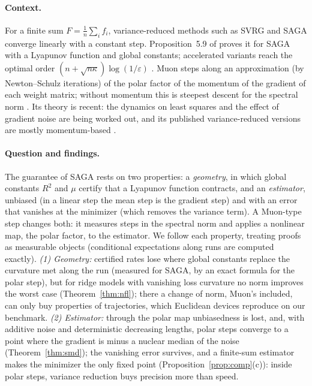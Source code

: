 \documentclass[10pt]{article}
\theoremstyle{remark}
\begin{document}
\paragraph{Context.} For a finite sum $F=\frac1n\sum_if_i$, variance-reduced methods such as SVRG
\cite{johnson2013accelerating} and SAGA \cite{defazio2014saga} converge linearly with a constant step. Proposition~5.9 of \cite{bach2024learning} proves it for SAGA with
a Lyapunov function and global constants; accelerated variants reach the optimal order
$(n+\sqrt{n\kappa})\log(1/\varepsilon)$ \cite{allenzhu2018katyusha,kovalev2020dont,lan2018optimal}. Muon
\cite{jordan2024muon} steps along an approximation (by Newton--Schulz iterations) of the polar factor of the momentum of
the gradient of each weight matrix; without momentum this is steepest descent for the spectral norm
\cite{carlson2015stochastic,bernstein2024old}. Its theory is recent: the dynamics on least squares
\cite{shulgin2026quadratic,vasudeva2025muon} and the effect of gradient noise \cite{xie2026muon,chen2026when,paquette2026phases}
are being worked out, and its published variance-reduced versions are mostly momentum-based \cite{liu2025marsm}.

\paragraph{Question and findings.} The guarantee of SAGA rests on two properties: a \emph{geometry}, in which global
constants $R^2$ and $\mu$ certify that a Lyapunov function contracts, and an \emph{estimator}, unbiased (in a linear
step the mean step is the gradient step) and with an error that vanishes at the minimizer (which removes the variance
term). A Muon-type step changes both: it measures steps in the spectral norm and applies a nonlinear map, the polar
factor, to the estimator. We follow each property, treating proofs as measurable objects
(conditional expectations along runs are computed exactly). \emph{(1) Geometry:} certified rates lose
where global constants replace the curvature met along the run (measured for SAGA, by an exact formula for the polar
step), but for ridge
models with vanishing loss curvature no norm improves the worst case (Theorem~\ref{thm:nfl}); there a change of
norm, Muon's included, can only buy properties of trajectories, which Euclidean devices reproduce on our benchmark. \emph{(2) Estimator:}
through the polar map unbiasedness is lost, and, with additive noise and deterministic decreasing lengths, polar steps
converge to a point where the gradient is minus a
nuclear median of the noise (Theorem~\ref{thm:smd}); the vanishing error survives, and a finite-sum estimator makes the
minimizer the only fixed point (Proposition~\ref{prop:comp}(c)): inside polar steps, variance reduction buys precision
more than speed.
\end{document}
